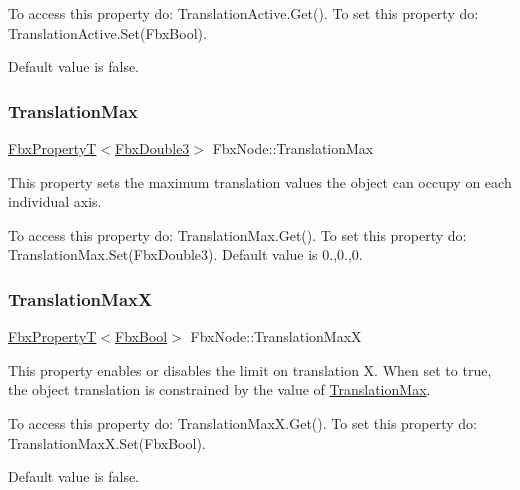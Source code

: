 To access this property do\+: Translation\+Active.\+Get(). To set this property do\+: Translation\+Active.\+Set(\+Fbx\+Bool).

Default value is false. \mbox{\label{class_fbx_node_ad5867ca599b10137c3caf2eb102eaff7}} 
\subsubsection{\texorpdfstring{Translation\+Max}{TranslationMax}}
{\footnotesize\ttfamily \hyperlink{class_fbx_property_t}{Fbx\+PropertyT}$<$\hyperlink{fbxtypes_8h_ae0a96f14cde566774c7553aa7523b7a7}{Fbx\+Double3}$>$ Fbx\+Node\+::\+Translation\+Max}

This property sets the maximum translation values the object can occupy on each individual axis.

To access this property do\+: Translation\+Max.\+Get(). To set this property do\+: Translation\+Max.\+Set(\+Fbx\+Double3). Default value is 0.,0.,0. \mbox{\label{class_fbx_node_a07a5df097d43dc3069669a448b3b8179}} 
\subsubsection{\texorpdfstring{Translation\+MaxX}{TranslationMaxX}}
{\footnotesize\ttfamily \hyperlink{class_fbx_property_t}{Fbx\+PropertyT}$<$\hyperlink{fbxtypes_8h_a92e0562b2fe33e76a242f498b362262e}{Fbx\+Bool}$>$ Fbx\+Node\+::\+Translation\+MaxX}

This property enables or disables the limit on translation X. When set to {\ttfamily true}, the object translation is constrained by the value of \hyperlink{class_fbx_node_ad5867ca599b10137c3caf2eb102eaff7}{Translation\+Max}.

To access this property do\+: Translation\+Max\+X.\+Get(). To set this property do\+: Translation\+Max\+X.\+Set(\+Fbx\+Bool).

Default value is false. \mbox{\label{class_fbx_node_a68ce7c657e10023ec08fc70461a3624e}} 
